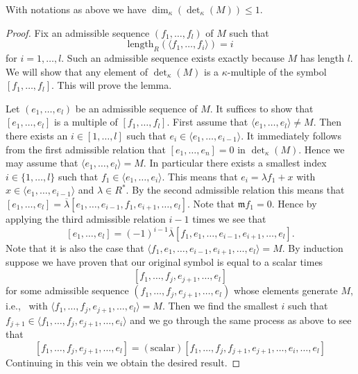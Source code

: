 \begin{lemma}
\label{lemma-dimension-at-most-one}
With notations as above we have $\dim_\kappa(\det_\kappa(M)) \leq 1$.
\end{lemma}

\begin{proof}
Fix an admissible sequence $(f_1, \ldots, f_l)$ of $M$ such that
$$
\text{length}_R(\langle f_1, \ldots, f_i\rangle) = i
$$
for $i = 1, \ldots, l$. Such an admissible sequence exists exactly because
$M$ has length $l$. We will show that any element of
$\det_\kappa(M)$ is a $\kappa$-multiple of the symbol
$[f_1, \ldots, f_l]$. This will prove the lemma.

\medskip\noindent
Let $(e_1, \ldots, e_l)$ be an admissible sequence of $M$.
It suffices to show that $[e_1, \ldots, e_l]$ is a multiple
of $[f_1, \ldots, f_l]$. First assume that
$\langle e_1, \ldots, e_l\rangle \not = M$. Then there exists
an $i \in [1, \ldots, l]$ such that
$e_i \in \langle e_1, \ldots, e_{i - 1}\rangle$. It immediately
follows from the first admissible relation that
$[e_1, \ldots, e_n] = 0$ in $\det_\kappa(M)$.
Hence we may assume that $\langle e_1, \ldots, e_l\rangle = M$.
In particular there exists a smallest index $i \in \{1, \ldots, l\}$
such that $f_1 \in \langle e_1, \ldots, e_i\rangle$. This means
that $e_i = \lambda f_1 + x$ with
$x \in \langle e_1, \ldots, e_{i - 1}\rangle$ and $\lambda \in R^*$.
By the second admissible relation this means that
$[e_1, \ldots, e_l] =
\overline{\lambda}[e_1, \ldots, e_{i - 1}, f_1, e_{i + 1}, \ldots, e_l]$.
Note that $\mathfrak m f_1 = 0$. Hence by applying the third
admissible relation $i - 1$ times we see that
$$
[e_1, \ldots, e_l] =
(-1)^{i - 1}\overline{\lambda}
[f_1, e_1, \ldots, e_{i - 1}, e_{i + 1}, \ldots, e_l].
$$
Note that it is also the case that
$ \langle f_1, e_1, \ldots, e_{i - 1}, e_{i + 1}, \ldots, e_l\rangle = M$.
By induction suppose we have proven that our original
symbol is equal to a scalar times
$$
[f_1, \ldots, f_j, e_{j + 1}, \ldots, e_l]
$$
for some admissible sequence $(f_1, \ldots, f_j, e_{j + 1}, \ldots, e_l)$
whose elements generate $M$, i.e., \ with
$\langle f_1, \ldots, f_j, e_{j + 1}, \ldots, e_l\rangle = M$.
Then we find the smallest $i$ such that
$f_{j + 1} \in \langle f_1, \ldots, f_j, e_{j + 1}, \ldots, e_i\rangle$
and we go through the same process as above to see that
$$
[f_1, \ldots, f_j, e_{j + 1}, \ldots, e_l]
=
(\text{scalar}) [f_1, \ldots, f_j, f_{j + 1}, e_{j + 1},
\ldots, \hat{e_i}, \ldots, e_l]
$$
Continuing in this vein we obtain the desired result.
\end{proof}

